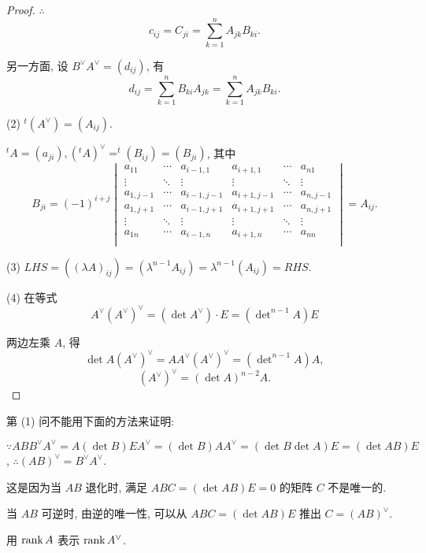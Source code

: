 \documentclass[color=black,device=normal,lang=cn,mode=geye]{elegantnote}
\begin{document}
\begin{proof}
    $\therefore$
    \[c_{ij}=C_{ji}=\sum\limits_{k=1}^nA_{jk}B_{ki}.\]

    另一方面, 设 $B^\vee A^\vee=(d_{ij})$, 有
    \[d_{ij}=\sum\limits_{k=1}^nB_{ki}A_{jk}=\sum\limits_{k=1}^nA_{jk}B_{ki}.\]

    (2) $^t(A^\vee)=(A_{ij})$.

    $^tA=(a_{ji}),(^tA)^\vee=^t(B_{ij})=(B_{ji})$, 其中
    \[B_{ji}=(-1)^{i+j}\begin{vmatrix}
        a_{11} & \cdots & a_{i-1,1} & a_{i+1,1} & \cdots & a_{n1} \\
        \vdots & \ddots & \vdots & \vdots & \ddots & \vdots \\
        a_{1,j-1} & \cdots & a_{i-1,j-1} & a_{i+1,j-1} & \cdots & a_{n,j-1} \\
        a_{1,j+1} & \cdots & a_{i-1,j+1} & a_{i+1,j+1} & \cdots & a_{n,j+1} \\
        \vdots & \ddots & \vdots & \vdots & \ddots & \vdots \\
        a_{1n} & \cdots & a_{i-1,n} & a_{i+1,n} & \cdots & a_{nn} \\
    \end{vmatrix}=A_{ij}.\]

    (3) $LHS=((\lambda A)_{ij})=(\lambda^{n-1}A_{ij})=\lambda^{n-1}(A_{ij})=RHS$.

    (4) 在等式
    \[A^\vee(A^\vee)^\vee=(\det A^\vee)\cdot E=(\det\nolimits^{n-1}A)E\]

    两边左乘 $A$, 得
    \[\det A(A^\vee)^\vee=AA^\vee(A^\vee)^\vee=(\det\nolimits^{n-1}A)A,\]
    \[(A^\vee)^\vee=(\det A)^{n-2}A.\]
\end{proof}
\begin{note}
    第 (1) 问不能用下面的方法来证明:

    $\because ABB^\vee A^\vee=A(\det B)EA^\vee=(\det B)AA^\vee=(\det B\det A)E=(\det AB)E$, $\therefore (AB)^\vee=B^\vee A^\vee$.

    这是因为当 $AB$ 退化时, 满足 $ABC=(\det AB)E=0$ 的矩阵 $C$ 不是唯一的.

    当 $AB$ 可逆时, 由逆的唯一性, 可以从 $ABC=(\det AB)E$ 推出 $C=(AB)^\vee$.
\end{note}
\begin{exercise}%
    用 $\operatorname{rank} A$ 表示 $\operatorname{rank} A^\vee$.
\end{exercise}
\end{document}
